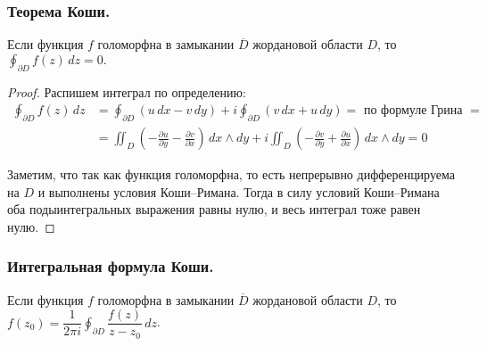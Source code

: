 \subsubsection{Теорема Коши.}
\begin{theorem*}
	Если функция $f$ голоморфна в замыкании $\overline{D}$ жордановой области $D$, то $\oint_{\partial D} f(z)\,dz = 0.$
\end{theorem*}
\begin{proof}
	Распишем интеграл по определению:
	\begin{align*}
		\oint_{\partial D} f(z)\,dz &= 	\oint_{\partial D} (u\,dx - v\,dy) + i 	\oint_{\partial D} (v\,dx + u\, dy) = \text{ по формуле Грина } = \\		
		&= \iint_{D} \left(-\frac{\partial u}{\partial y} - \frac{\partial v}{\partial x}\right)\, dx \wedge dy + i \iint_{D} \left(-\frac{\partial v}{\partial y} + \frac{\partial u}{\partial x}\right)\, dx \wedge dy  = 0
	\end{align*}

	Заметим, что так как функция голоморфна, то есть непрерывно дифференцируема на $D$ и выполнены условия Коши--Римана. Тогда в силу условий Коши--Римана оба подыинтегральных выражения равны нулю, и весь интеграл тоже равен нулю.
\end{proof}	

\subsubsection{Интегральная формула Коши.}
	Если функция $f$ голоморфна в замыкании $\overline{D}$ жордановой области $D$, то $f(z_0) = \dfrac{1}{2\pi i} \oint_{\partial D} \dfrac{f(z)}{z - z_0}\, dz$.